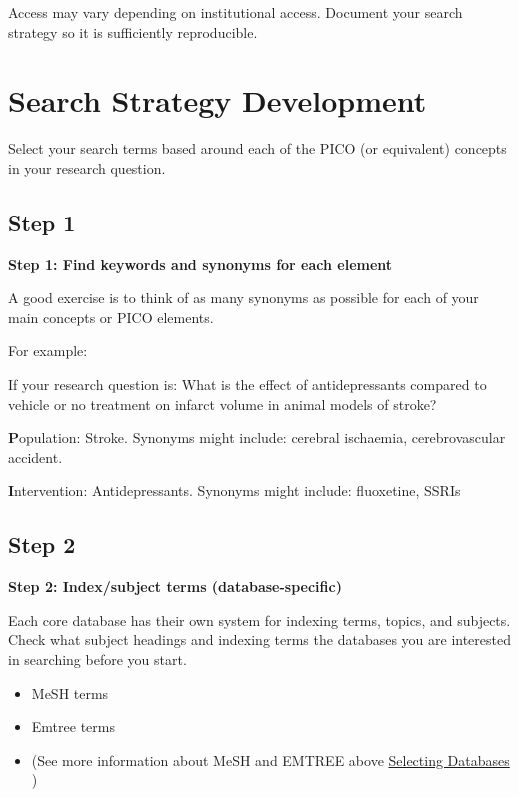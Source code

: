\documentclass[
]{book}
\providecommand{\tightlist}{%
  \setlength{\itemsep}{0pt}\setlength{\parskip}{0pt}}
\begin{document}
Access may vary depending on institutional access. Document your search strategy so it is sufficiently reproducible.

\hypertarget{search-strategy-development}{%
\section{Search Strategy Development}\label{search-strategy-development}}

Select your search terms based around each of the PICO (or equivalent) concepts in your research question.

\hypertarget{step-1}{%
\subsection{Step 1}\label{step-1}}

\textbf{Step 1: Find keywords and synonyms for each element}

A good exercise is to think of as many synonyms as possible for each of your main concepts or PICO elements.

For example:

If your research question is: What is the effect of antidepressants compared to vehicle or no treatment on infarct volume in animal models of stroke?

\textbf{P}opulation: Stroke. Synonyms might include: cerebral ischaemia, cerebrovascular accident.

\textbf{I}ntervention: Antidepressants. Synonyms might include: fluoxetine, SSRIs

\hypertarget{step-2}{%
\subsection{Step 2}\label{step-2}}

\textbf{Step 2: Index/subject terms (database-specific)}

Each core database has their own system for indexing terms, topics, and subjects. Check what subject headings and indexing terms the databases you are interested in searching before you start.

\begin{itemize}
\tightlist
\item
  MeSH terms
\item
  Emtree terms
\item
  (See more information about MeSH and EMTREE above \protect\hyperlink{Selecting-Databases}{Selecting Databases} )
\end{itemize}
\end{document}
